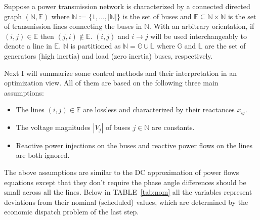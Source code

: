 \documentclass[journal,12pt,onecolumn,draftclsnofoot]{IEEEtran}
\begin{document}
Suppose a power transmission network is characterized by a connected directed graph $(\mathbb{N},\mathbb{E})$ where $\mathbb{N}:=\{1,\dots,|\mathbb{N}|\}$ is the set of buses and $\mathbb{E}\subseteq \mathbb{N}\times \mathbb{N}$ is the set of transmission lines connecting the buses in $\mathbb{N}$. With an arbitrary orientation, if $(i,j)\in\mathbb{E}$ then $(j,i)\notin \mathbb{E}$. $(i,j)$ and $i\rightarrow j$ will be used interchangeably to denote a line in $\mathbb{E}$. $\mathbb{N}$ is partitioned as $\mathbb{N}=\mathbb{G} \cup \mathbb{L}$ where $\mathbb{G}$ and $\mathbb{L}$ are the set of generators (high inertia) and load (zero inertia) buses, respectively.

Next I will summarize some control methods and their interpretation in an optimization view. All of them are based on the following three main assumptions:
\begin{itemize}
	\item The lines $(i,j)\in \mathbb{E}$ are lossless and characterized by their reactances $x_{ij}$.
	\item The voltage magnitudes $|V_j|$ of buses $j\in\mathbb{N}$ are constants.
	\item Reactive power injections on the buses and reactive power flows on the lines are both ignored.
\end{itemize} 
The above assumptions are similar to the DC approximation of power flows equations except that they don't require the phase angle differences should be small across all the lines. Below in TABLE~\ref{tab:nom} all the variables represent deviations from their nominal (scheduled) values, which are determined by the economic dispatch problem of the last step.  
\end{document}
